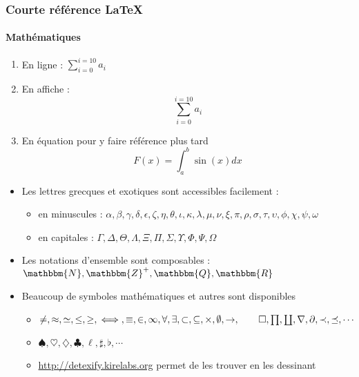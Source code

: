 \begin{frame}[allowframebreaks] %
  \frametitle{Courte référence \LaTeX{}}
  \framesubtitle{Mathématiques}


  \begin{enumerate}
  \item En ligne : $ \sum_{i=0}^{i=10} a_{i} $

  \item En affiche :
    \begin{displaymath}
      \sum_{i=0}^{i=10} a_{i}
    \end{displaymath}

  \item En équation pour y faire référence plus tard
    \begin{equation}
      \label{eq:1}
      F(x) = \int_{a}^{b}\sin(x)dx 
    \end{equation}
  \end{enumerate}
  

  \begin{itemize}
  \item Les lettres grecques et exotiques sont accessibles facilement :

    \begin{itemize}
    \item en minuscules : $ \alpha, \beta, \gamma, \delta, \epsilon, \zeta, \eta, \theta, \iota, \kappa, \lambda, \mu, \nu, \xi, \pi, \rho, \sigma, \tau, \upsilon, \phi, \chi, \psi, \omega $
    \item en capitales : $ \Gamma, \Delta, \Theta, \Lambda, \Xi, \Pi, \Sigma, \Upsilon, \Phi, \Psi, \Omega $
    \end{itemize}

  \item Les notations d'ensemble sont composables : $ \mathbbm{N}, \mathbbm{Z}^{+}, \mathbbm{Q}, \mathbbm{R} $

  \item Beaucoup de symboles mathématiques et autres sont disponibles

    \begin{itemize}
    \item $ \neq, \approx, \simeq, \le, \ge, \iff, \equiv, \in, \infty, \forall, \exists, \subset, \subseteq, \times, \emptyset, \rightarrow, \qed, \prod, \coprod, \nabla, \partial, \prec, \preceq, \cdots $
    \item $ \spadesuit, \heartsuit, \diamondsuit, \clubsuit, \ell, \sharp, \flat, \cdots $
    \item \url{http://detexify.kirelabs.org} permet de les trouver en les dessinant
    \end{itemize}


\end{itemize}
\end{frame}
